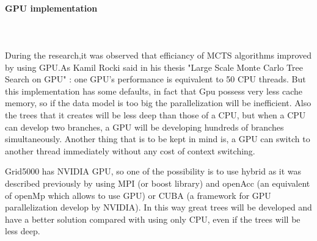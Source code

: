 \paragraph{GPU implementation}\mbox{}\\\mbox{}\\

	During the research,it was observed that efficiancy of  MCTS algorithms improved by using GPU.As Kamil Rocki said in his thesis "Large Scale Monte Carlo Tree Search on GPU"  \cite{GPU} : one GPU's performance is equivalent to 50 CPU threads. But this implementation has some defaults, in fact that Gpu possess very less cache memory, so if the data model is too big the parallelization will be inefficient. Also the trees that it creates will be less deep than those of a CPU, but when a CPU can develop two branches, a GPU will be developing hundreds of branches simultaneously. Another thing that is to be kept in mind is, a GPU can switch to another thread immediately without any cost of context switching. 

	Grid5000 has NVIDIA GPU, so one of the possibility is to use hybrid as it was described previously by using MPI (or boost library) and openAcc (an equivalent of openMp which allows to use GPU) or CUBA (a framework for GPU parallelization develop by NVIDIA). In this way  great trees will be developed and have a better solution compared with using only CPU, even if the trees will be less deep.